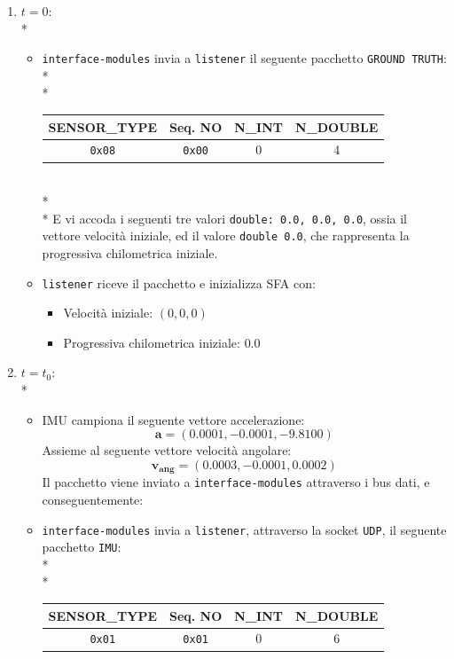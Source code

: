 \begin{enumerate}
	\item $t = 0$:\\*
	\begin{itemize}
	\item \texttt{interface-modules} invia a \texttt{listener} il seguente pacchetto \texttt{GROUND TRUTH}:\\*\\*
	\begin{tabular}{|c|c|c|c|}
		\hline 
		\textbf{SENSOR\_TYPE} & \textbf{Seq. NO} & \textbf{N\_INT} & \textbf{N\_DOUBLE} \\ 
		\hline 
		\texttt{0x08} & \texttt{0x00} & 0 & 4 \\ 
		\hline 
	\end{tabular}\\*\\*
	E vi accoda i seguenti tre valori \texttt{double: 0.0, 0.0, 0.0}, ossia il vettore velocit\`a iniziale, ed il valore \texttt{double 0.0}, che rappresenta la progressiva chilometrica iniziale.
	\item \texttt{listener} riceve il pacchetto e inizializza SFA con:
	\begin{itemize}
		\item Velocit\`a iniziale: $(0, 0, 0)$
		\item Progressiva chilometrica iniziale: $0.0$
	\end{itemize}
	\end{itemize}
	\newpage
	\item $t=t_0$:\\*
	\begin{itemize}
	\item IMU campiona il seguente vettore accelerazione:
	$$
	\mathbf{a} = (0.0001, -0.0001, -9.8100)
	$$
	Assieme al seguente vettore velocit\`a angolare:
	$$
	\mathbf{v_{ang}} = (0.0003, -0.0001, 0.0002)
	$$
	Il pacchetto viene inviato a \texttt{interface-modules} attraverso i bus dati, e conseguentemente:
	\item \texttt{interface-modules} invia a \texttt{listener}, attraverso la socket \texttt{UDP}, il seguente pacchetto \texttt{IMU}:\\*\\*
		\begin{tabular}{|c|c|c|c|}
		\hline 
		\textbf{SENSOR\_TYPE} & \textbf{Seq. NO} & \textbf{N\_INT} & \textbf{N\_DOUBLE} \\ 
		\hline 
		\texttt{0x01} & \texttt{0x01} & 0 & 6 \\ 

\end{tabular}
\end{itemize}
\end{enumerate}

